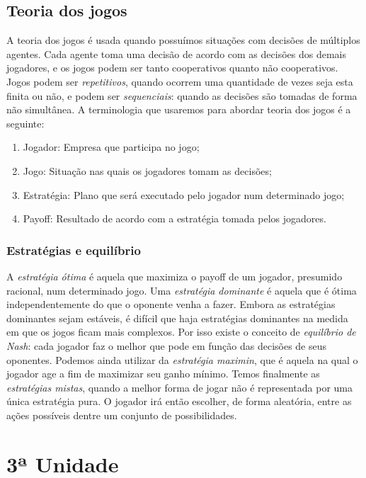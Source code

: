\documentclass[12pt,a4paper,oneside,brazil]{abntex2}
\begin{document}
\section{Teoria dos jogos}
A teoria dos jogos é usada quando possuímos situações com decisões de múltiplos agentes. Cada agente toma uma decisão de acordo com as decisões dos demais jogadores, e os jogos podem ser tanto cooperativos quanto não cooperativos. Jogos podem ser \emph{repetitivos}, quando ocorrem uma quantidade de vezes seja esta finita ou não, e podem ser \emph{sequenciais}: quando as decisões são tomadas de forma não simultânea. A terminologia que usaremos para abordar teoria dos jogos é a seguinte:

\begin{enumerate}
	\item Jogador: Empresa que participa no jogo;
	\item Jogo: Situação nas quais os jogadores tomam as decisões;
	\item Estratégia: Plano que será executado pelo jogador num determinado jogo;
	\item Payoff: Resultado de acordo com a estratégia tomada pelos jogadores.
\end{enumerate}

\subsection{Estratégias e equilíbrio}

A \emph{estratégia ótima} é aquela que maximiza o payoff de um jogador, presumido racional, num determinado jogo. Uma \emph{estratégia dominante} é aquela que é ótima independentemente do que o oponente venha a fazer. Embora as estratégias dominantes sejam estáveis, é difícil que haja estratégias dominantes na medida em que os jogos ficam mais complexos. Por isso existe o conceito de \emph{equilíbrio de Nash}: cada jogador faz o melhor que pode em função das decisões de seus oponentes. Podemos ainda utilizar da \emph{estratégia maximin}, que é aquela na qual o jogador age a fim de maximizar seu ganho mínimo. Temos finalmente as \emph{estratégias mistas}, quando a melhor forma de jogar não é representada por uma única estratégia pura. O jogador irá então escolher, de forma aleatória, entre as ações possíveis dentre um conjunto de possibilidades.


\chapter{3ª Unidade}
\end{document}
